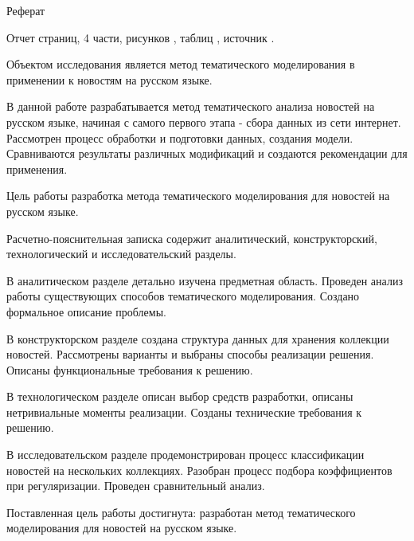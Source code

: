Реферат

Отчет страниц, 4 части, \todo{} рисунков\todo{} , \todo{} таблиц\todo{} , \todo{} источник\todo{} .

Объектом исследования является метод тематического моделирования в применении к новостям на русском языке.

В данной работе разрабатывается метод тематического анализа новостей на русском языке, начиная с самого первого этапа - сбора данных из сети интернет. Рассмотрен процесс обработки и подготовки данных, создания модели. Сравниваются результаты различных модификаций и создаются рекомендации для применения.

Цель работы разработка метода тематического моделирования для новостей на русском языке.

Расчетно-пояснительная записка содержит аналитический, конструкторский, технологический и исследовательский разделы.

В аналитическом разделе детально изучена предметная область. Проведен анализ работы существующих способов тематического моделирования. Создано формальное описание проблемы.

В конструкторском разделе создана структура данных для хранения коллекции новостей. Рассмотрены варианты и выбраны способы реализации решения. Описаны функциональные требования к решению.

В технологическом разделе описан выбор средств разработки, описаны нетривиальные моменты реализации. Созданы технические требования к решению.

В исследовательском разделе продемонстрирован процесс классификации новостей на нескольких коллекциях. Разобран процесс подбора коэффициентов при регуляризации. Проведен сравнительный анализ.

Поставленная цель работы достигнута: разработан метод тематического моделирования для новостей на русском языке.